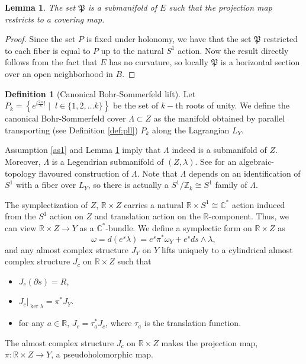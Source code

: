 \documentclass[11pt, oneside,dvipsnames]{amsart}
\renewcommand{\to}{\rightarrow}
\newcommand{\R}{\mathbb{R}}
\newcommand{\sub}{\subset}
\renewcommand{\to}{\rightarrow}
\newcommand{\<}{\langle}
\renewcommand{\>}{\rangle}
\newcommand{\bC}{\mathbb{C}}
\newcommand{\bR}{\mathbb{R}}
\newcommand{\bZ}{\mathbb{Z}}
\renewcommand{\to}{\rightarrow}
\newtheorem{lemma}[Theorem]{Lemma}
\theoremstyle{definition}
\theoremstyle{definition}
\newtheorem{defn}[Theorem]{Definition}
\numberwithin{equation}{subsection}
\begin{document}
\begin{lemma}\label{lemm:pllmanifold}
    The set $\mathfrak{P}$ is a submanifold of $E$ such that the projection map restricts to a covering map. 
\end{lemma}
\begin{proof}
    Since the set $P$ is fixed under holonomy, we have that the set $\mathfrak{P}$ restricted to each fiber is equal to $P$ up to the natural $S^1$ action. Now the result directly follows from the fact that $E$ has no curvature, so locally $\mathfrak P$ is a horizontal section over an open neighborhood in $B$. 
\end{proof}


\begin{defn}[Canonical Bohr-Sommerfeld lift]
Let $P_k = \left\{ e^{i\frac {2\pi} {k} l} \; | \; \; l\in \{ 1, 2,\dots k\}\right\}$ be the set of $k-$th roots of unity. We define the canonical Bohr-Sommerfeld cover $\Lambda \sub Z$ as the manifold obtained by parallel transporting (see Definition \ref{def:pll}) $P_k$ along the Lagrangian $L_Y$. 
\end{defn}
Assumption \ref{as1} and Lemma \ref{lemm:pllmanifold}  imply that $\Lambda$ indeed is a submanifold of $Z$. Moreover,  $\Lambda$ is a Legendrian submanifold of $(Z,\lambda)$.  See \cite[\S~4.1]{rg19} for an algebraic-topology flavoured construction of $\Lambda$. Note that $\Lambda$ depends on an identification of $S^1$ with a fiber over $L_Y$, so there is actually a $ S^1/ \bZ_k \cong S^1 $ family of $\Lambda$.

The symplectization of $Z$, $\bR \times Z$ carries a natural $\bR \times S^1 \cong \bC^*$ action induced from the $S^1$ action on $Z$ and translation action on the $\R$-component. Thus, we can view $\bR \times Z \to Y$ as a $\bC^*$-bundle. We define a symplectic form on $\bR \times Z$ as $$\omega= d(e^s \lambda) = e^s\pi^*\omega_Y  + e^s ds\wedge \lambda,$$
and any almost complex structure $J_Y$ on $Y$ lifts uniquely to a cylindrical almost complex structure $J_c$ on $\bR \times Z$ such that 
\begin{itemize}
    \item $J_c (\partial s) = R$,
    \item $J_c|_{\ker \lambda} = \pi^* J_Y$.
    \item for any $a\in \bR$, $J_c = \tau_a^*J_c$, where $\tau_a$ is the translation function.
\end{itemize}
The almost complex structure $J_c$ on $\bR \times Z$ makes the projection map, $\pi: \bR \times Z \to Y$, a pseudoholomorphic map.
\end{document}
